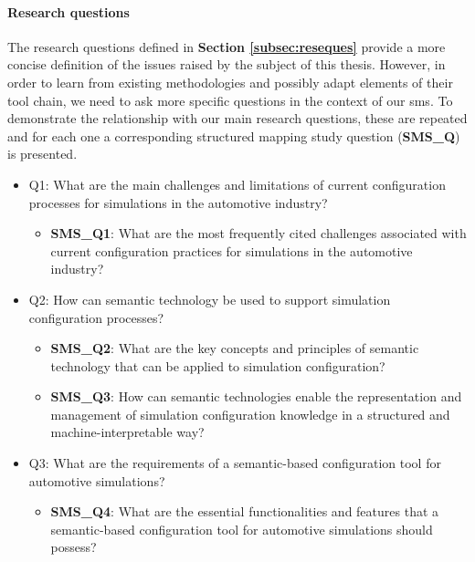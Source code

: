             \paragraph{Research questions\label{para:res-ques}}
            The research questions defined in \textbf{Section \ref{subsec:reseques}} provide a more concise definition of the issues raised by the subject of this thesis. However, in order to learn from existing methodologies and possibly adapt elements of their tool chain, we need to ask more specific questions in the context of our \acrshort{sms}. To demonstrate the relationship with our main research questions, these are repeated and for each one a corresponding structured mapping study question (\textbf{SMS\_Q}) is presented.

            \begin{itemize}
                \item Q1: What are the main challenges and limitations of current configuration processes for simulations in the automotive industry?
                    \begin{itemize}
                        \item \textbf{SMS\_Q1}: What are the most frequently cited challenges associated with current configuration practices for simulations in the automotive industry?
                    \end{itemize}


                \item Q2: How can semantic technology be used to support simulation configuration processes?
                    \begin{itemize}
                        \item \textbf{SMS\_Q2}: What are the key concepts and principles of semantic technology that can be applied to simulation configuration?

                        \item \textbf{SMS\_Q3}: How can semantic technologies enable the representation and management of simulation configuration knowledge in a structured and machine-interpretable way?
                    \end{itemize}
                    
                \item Q3: What are the requirements of a semantic-based configuration tool for automotive simulations?
                    \begin{itemize}
                        \item \textbf{SMS\_Q4}: What are the essential functionalities and features that a semantic-based configuration tool for automotive simulations should possess?
                    \end{itemize}



\end{itemize}
